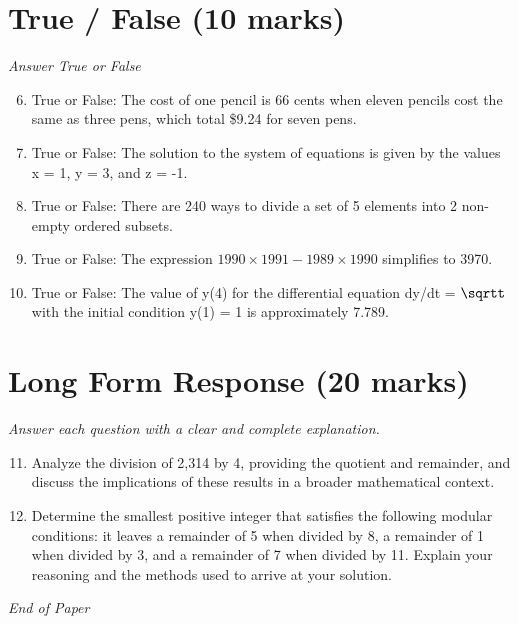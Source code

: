 \documentclass[12pt]{article}
\begin{document}
\section*{True / False (10 marks)}
\textit{Answer True or False}
\begin{enumerate}[label=\arabic*.]
\setcounter{enumi}{5}
\item True or False: The cost of one pencil is 66 cents when eleven pencils cost the same as three pens, which total \$9.24 for seven pens.
\item True or False: The solution to the system of equations is given by the values x = 1, y = 3, and z = -1.
\item True or False: There are 240 ways to divide a set of 5 elements into 2 non-empty ordered subsets.
\item True or False: The expression $1990 \times 1991 - 1989 \times 1990$ simplifies to 3970.
\item True or False: The value of y(4) for the differential equation dy/dt = \ensuremath{\sqrtt} with the initial condition y(1) = 1 is approximately 7.789.
\end{enumerate}

\section*{Long Form Response (20 marks)}
\textit{Answer each question with a clear and complete explanation.}
\begin{enumerate}[label=\arabic*.]
\setcounter{enumi}{10}
\item Analyze the division of 2,314 by 4, providing the quotient and remainder, and discuss the implications of these results in a broader mathematical context.
\item Determine the smallest positive integer that satisfies the following modular conditions: it leaves a remainder of 5 when divided by 8, a remainder of 1 when divided by 3, and a remainder of 7 when divided by 11. Explain your reasoning and the methods used to arrive at your solution.
\end{enumerate}

\vfill
\noindent\textit{End of Paper}
\end{document}
